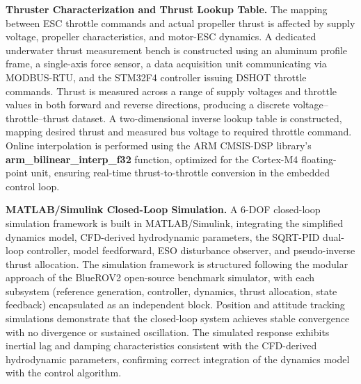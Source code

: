 \begin{digest}
\textbf{Thruster Characterization and Thrust Lookup Table.} The mapping between ESC throttle commands and actual propeller thrust is affected by supply voltage, propeller characteristics, and motor-ESC dynamics. A dedicated underwater thrust measurement bench is constructed using an aluminum profile frame, a single-axis force sensor, a data acquisition unit communicating via MODBUS-RTU, and the STM32F4 controller issuing DSHOT throttle commands. Thrust is measured across a range of supply voltages and throttle values in both forward and reverse directions, producing a discrete voltage--throttle--thrust dataset. A two-dimensional inverse lookup table is constructed, mapping desired thrust and measured bus voltage to required throttle command. Online interpolation is performed using the ARM CMSIS-DSP library's \textbf{arm\_bilinear\_interp\_f32} function, optimized for the Cortex-M4 floating-point unit, ensuring real-time thrust-to-throttle conversion in the embedded control loop.

\textbf{MATLAB/Simulink Closed-Loop Simulation.} A 6-DOF closed-loop simulation framework is built in MATLAB/Simulink, integrating the simplified dynamics model, CFD-derived hydrodynamic parameters, the SQRT-PID dual-loop controller, model feedforward, ESO disturbance observer, and pseudo-inverse thrust allocation. The simulation framework is structured following the modular approach of the BlueROV2 open-source benchmark simulator, with each subsystem (reference generation, controller, dynamics, thrust allocation, state feedback) encapsulated as an independent block. Position and attitude tracking simulations demonstrate that the closed-loop system achieves stable convergence with no divergence or sustained oscillation. The simulated response exhibits inertial lag and damping characteristics consistent with the CFD-derived hydrodynamic parameters, confirming correct integration of the dynamics model with the control algorithm.


\end{digest}
